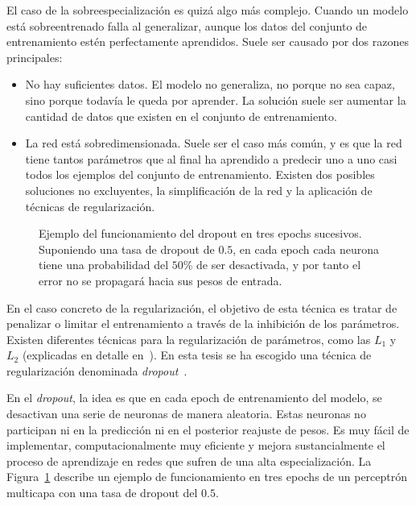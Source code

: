 El caso de la sobreespecialización es quizá algo más complejo. Cuando un modelo está sobreentrenado falla al generalizar, aunque los datos del conjunto de entrenamiento estén perfectamente aprendidos. Suele ser causado por dos razones principales:

\begin{itemize}
	\item No hay suficientes datos. El modelo no generaliza, no porque no sea capaz, sino porque todavía le queda por aprender. La solución suele ser aumentar la cantidad de datos que existen en el conjunto de entrenamiento.
	\item La red está sobredimensionada. Suele ser el caso más común, y es que la red tiene tantos parámetros que al final ha aprendido a predecir uno a uno casi todos los ejemplos del conjunto de entrenamiento. Existen dos posibles soluciones no excluyentes, la simplificación de la red y la aplicación de técnicas de regularización.
\end{itemize}

\begin{figure}[!b]
	\centering
	\qquad
	\qquad
	\caption[Ejemplo de la operación de dropout para tres epochs sucesivos]{Ejemplo del funcionamiento del dropout en tres epochs sucesivos. Suponiendo una tasa de dropout de $0.5$, en cada epoch cada neurona tiene una probabilidad del $50\%$ de ser desactivada, y por tanto el error no se propagará hacia sus pesos de entrada.}
	\label{fig:dropout-example}
\end{figure}

En el caso concreto de la regularización, el objetivo de esta técnica es tratar de penalizar o limitar el entrenamiento a través de la inhibición de los parámetros. Existen diferentes técnicas para la regularización de parámetros, como las $L_1$ y $L_2$ (explicadas en detalle en~\cite{ng2004feature}). En esta tesis se ha escogido una técnica de regularización denominada \textit{dropout}~\cite{srivastava2014dropout}.

En el \textit{dropout}, la idea es que en cada epoch de entrenamiento del modelo, se desactivan una serie de neuronas de manera aleatoria. Estas neuronas no participan ni en la predicción ni en el posterior reajuste de pesos. Es muy fácil de implementar, computacionalmente muy eficiente y mejora sustancialmente el proceso de aprendizaje en redes que sufren de una alta especialización. La Figura~\ref{fig:dropout-example} describe un ejemplo de funcionamiento en tres epochs de un perceptrón multicapa con una tasa de dropout del $0.5$.

